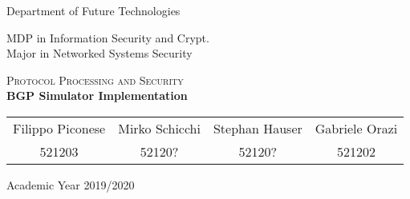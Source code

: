 \pagestyle{plain}

\thispagestyle{empty}

\begin{center}
  \begin{figure}[h!]
    \centerline{}
  \end{figure}


  \LARGE{Department of Future Technologies}

  \vspace{1 cm}
  \Large{MDP in Information Security and Crypt.\\
  Major in Networked Systems Security}

  \vspace{2 cm}
  \vspace{1 cm}
  \Huge\textsc{Protocol Processing and Security\\}
  \vspace{1cm}
  \LARGE{\textbf{BGP Simulator Implementation}\\}


  \vspace{4 cm}
  \begin{tabular}{cccc}
    Filippo Piconese & Mirko Schicchi & Stephan Hauser & Gabriele Orazi\\
    521203 & 52120? & 52120? & 521202\\
  \end{tabular}

  \vfill

  {\Large{Academic Year 2019/2020}}
\end{center}
